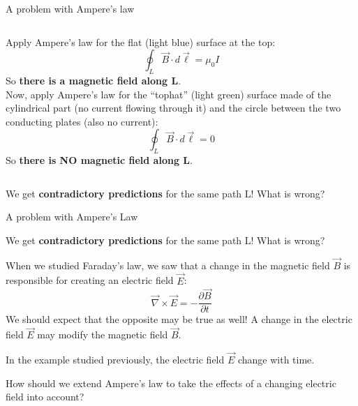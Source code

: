 \begin{frame}{A problem with Ampere's law}
\begin{columns}
\begin{column}{0.70\textwidth}
{      Apply Ampere's law for the flat (light blue) surface at the top:
      \begin{equation*}
          \oint_{L} \vec{B} \cdot d\vec{\ell} = \mu_{0} I
     \end{equation*}
     So {\bf there is a magnetic field along L}.\\
     \vspace{0.2cm}
      Now, apply Ampere's law for the ``tophat'' (light green) surface
      made of the cylindrical part (no current flowing through it) and the
      circle between the two conducting plates (also no current):
      \begin{equation*}
          \oint_{L} \vec{B} \cdot d\vec{\ell} = 0
     \end{equation*}
     So {\bf there is NO magnetic field along L}.\\
   }
  \end{column}
\end{columns}

\vspace{0.3cm}

We get {\bf contradictory predictions} for the same path L! What is wrong?

\end{frame}

%
%
%

\begin{frame}{A problem with Ampere's Law}

We get {\bf contradictory predictions} for the same path L! What is wrong?\\
\vspace{0.3cm}

When we studied Faraday's law, we saw that a change in the magnetic field $\vec{B}$
is responsible for creating an electric field $\vec{E}$:
\begin{equation*}
  \vec{\nabla} \times \vec{E} = -\frac{\partial \vec{B}}{\partial t}
\end{equation*}
We should expect that the opposite may be true as well!
A change in the electric field $\vec{E}$ may modify the magnetic field $\vec{B}$.\\

\vspace{0.3cm}

In the example studied previously, the electric field $\vec{E}$ change with time.

\vspace{0.2cm}

How should we extend Ampere's law to take the effects of a changing electric field into account?

\end{frame}

